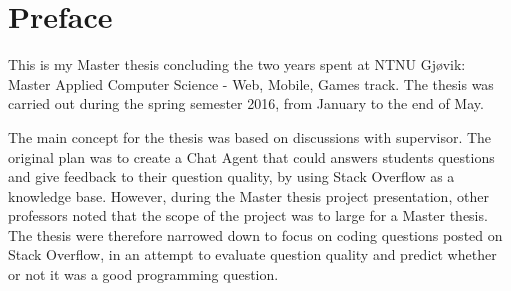\hypersetup{pageanchor=false}
%

\chapter*{Preface}
This is my Master thesis concluding the two years spent at NTNU Gjøvik: Master Applied Computer Science - Web, Mobile, Games track. 
The thesis was carried out during the spring semester 2016, from January to the end of May. 

The main concept for the thesis was based on discussions with supervisor. The original plan was to create a Chat Agent that could answers students questions and give feedback 
to their question quality, by using Stack Overflow as a knowledge base. However, during the Master thesis project presentation, other professors noted that the scope of the 
project was to large for a Master thesis. The thesis were therefore narrowed down to focus on coding questions posted on Stack Overflow, in an attempt to evaluate question quality 
and predict whether or not it was a good programming question. 

\thesisdate \\[1pc]
\\[1pc]
